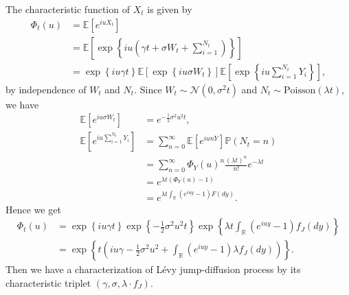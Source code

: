 The characteristic function of $X_t$ is given by
\begin{align*}
\Phi_t(u) &= \mathbb{E}\left[e^{iuX_t}\right]\\
&=\mathbb{E}\left[\exp\left\{iu\left(\gamma t + \sigma W_t+\sum_{i=1}^{N_t}\right)\right\}\right]\\
&= \exp\left\{iu\gamma t\right\}\mathbb{E}\left[\exp\left\{iu \sigma W_t\right\}\right]\mathbb{E}\left[\exp\left\{iu\sum_{i=1}^{N_t}Y_i\right\}\right],
\end{align*}
by independence of $W_t$ and $N_t$.
Since $W_t\sim\mathcal{N}(0,\sigma^2 t)$ and $N_t \sim \text{Poisson}(\lambda t)$, we have
\begin{align*}
\mathbb{E}\left[e^{iu\sigma W_t}\right]&=e^{-\frac{1}{2}\sigma^2 u^2 t}, \\
\mathbb{E}\left[e^{iu\sum_{i=1}^{N_t}Y_i}\right]&=\sum_{n=0}^\infty
\mathbb{E}\left[e^{iunY}\right]\mathbb{P}(N_t=n)\\
&=\sum_{n=0}^\infty \Phi_Y(u)^n\frac{(\lambda t)^n}{n!}e^{-\lambda t}\\
&=e^{\lambda t \left(\Phi_Y(u)-1\right)}\\
&=e^{\lambda t \int_\mathbb{R}\left(e^{iuy}-1\right)F(dy)}.
\end{align*}
Hence we get
\begin{align}\label{eq:CF_Ljd}
\Phi_t(u) &= \exp\left\{iu\gamma t\right\}\exp\left\{-\frac{1}{2}\sigma^2 u^2 t\right\}\exp\left\{\lambda t \int_\mathbb{R}\left(e^{iuy}-1\right)f_J(dy)\right\}\nonumber\\
&= \exp\left\{t\left(iu\gamma -\frac{1}{2}\sigma^2 u^2 + \int_\mathbb{R}\left(e^{iuy}-1\right)\lambda f_J(dy)\right)\right\}.
\end{align}
Then we have a characterization of L\'evy jump-diffusion process by its characteristic triplet $(\gamma,\sigma,\lambda\cdot f_J)$.

